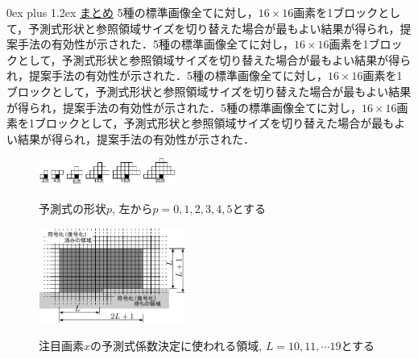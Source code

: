 \documentclass[9pt,dvipdfmx,uplatex]{jsarticle}
\makeatletter
\def\section{\@startsection {section}{1}{\z@}
{1ex plus -1ex minus-.2ex}%
{0ex plus 1.2ex}%
 {\normalsize\bf}%
 }
\makeatother
\begin{document}
\section{\underline{まとめ}}
5種の標準画像全てに対し，$16\times 16$画素を1ブロックとして，予測式形状と参照領域サイズを切り替えた場合が最もよい結果が得られ，提案手法の有効性が示された．5種の標準画像全てに対し，$16\times 16$画素を1ブロックとして，予測式形状と参照領域サイズを切り替えた場合が最もよい結果が得られ，提案手法の有効性が示された．5種の標準画像全てに対し，$16\times 16$画素を1ブロックとして，予測式形状と参照領域サイズを切り替えた場合が最もよい結果が得られ，提案手法の有効性が示された．5種の標準画像全てに対し，$16\times 16$画素を1ブロックとして，予測式形状と参照領域サイズを切り替えた場合が最もよい結果が得られ，提案手法の有効性が示された．


\begin{figure}[t]
   \begin{center}
    \vspace{5mm}
   \includegraphics[width=0.4\textwidth]{fig/fig1.pdf}
   \caption{予測式の形状$p$, 左から$p=0,1,2,3,4,5$とする}
   \label{takago-paper2008080800268-fig:1}
%
   \vspace{2mm}
\includegraphics[width=0.43\textwidth]{fig/fig2.pdf}
\caption{注目画素$x$の予測式係数決定に使われる領域, $L=10,11,\cdots19$とする}
\label{takago-paper2008080800268-fig:2}
   \end{center}
\end{figure}
\end{document}
